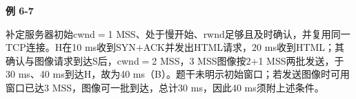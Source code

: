 {\color{ink}\bfseries 例 6-7}\par\vspace{1bp}补定服务器初始cwnd\(=\allowbreak{}\)1 MSS、处于慢开始、rwnd足够且及时确认，并复用同一TCP连接。H在10 ms收到SYN\(+\allowbreak{}\)ACK并发出HTML请求，20 ms收到HTML；其确认与图像请求到达S后，cwnd\(=\allowbreak{}\)2 MSS，3 MSS图像按2\(+\allowbreak{}\)1 MSS两批发送，于30 ms、40 ms到达H，故为40 ms（B）。题干未明示初始窗口；若发送图像时可用窗口已达3 MSS，图像可一批到达，总计30 ms，因此40 ms须附上述条件。
